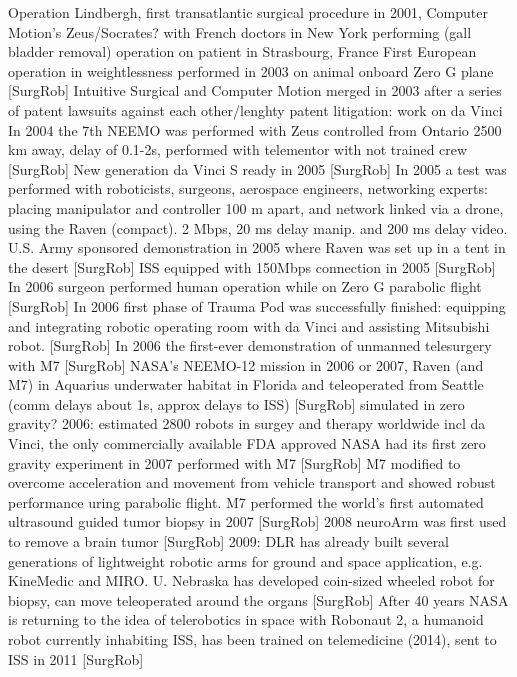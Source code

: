 Operation Lindbergh, first transatlantic surgical procedure in 2001, Computer Motion's Zeus/Socrates? with French doctors in New York performing (gall bladder removal) operation on patient in Strasbourg, France
First European operation in weightlessness performed in 2003 on animal onboard Zero G plane [SurgRob]
Intuitive Surgical and Computer Motion merged in 2003 \citep{bib:telesurg_history} after a series of patent lawsuits against each other/lenghty patent litigation: work on da Vinci
In 2004 the 7th NEEMO was performed with Zeus controlled from Ontario 2500 km away, delay of 0.1-2s, performed with telementor with not trained crew [SurgRob]
New generation da Vinci S ready in 2005 [SurgRob]
In 2005 a test was performed with roboticists, surgeons, aerospace engineers, networking experts: placing manipulator and controller 100 m apart, and network linked via a drone, using the Raven \citep{bib:docatadist} (compact). 2 Mbps, 20 ms delay manip. and 200 ms delay video. U.S. Army sponsored demonstration in 2005 where Raven was set up in a tent in the desert [SurgRob]
ISS equipped with 150Mbps connection in 2005 [SurgRob]
In 2006 surgeon performed human operation while on Zero G parabolic flight [SurgRob] 
In 2006 first phase of Trauma Pod was successfully finished: equipping and integrating robotic operating room  with da Vinci and assisting Mitsubishi robot. [SurgRob]
In 2006 the first-ever demonstration of unmanned telesurgery with M7 [SurgRob]
NASA's NEEMO-12 mission in 2006 or 2007, Raven (and M7) in Aquarius underwater habitat in Florida and teleoperated from Seattle (comm delays about 1s, approx delays to ISS) [SurgRob] simulated in zero gravity?
2006: estimated 2800 robots in surgey and therapy worldwide incl da Vinci, the only commercially available FDA approved
NASA had its first zero gravity experiment in 2007 performed with M7 [SurgRob] M7 modified to overcome acceleration and movement from vehicle transport and showed robust performance uring parabolic flight.
M7 performed the world's first automated ultrasound guided tumor biopsy in 2007 [SurgRob]
2008 neuroArm was first used to remove a brain tumor [SurgRob]
2009: DLR has already built several generations of lightweight robotic arms for ground and space application, e.g. KineMedic and MIRO. U. Nebraska has developed coin-sized wheeled robot for biopsy, can move teleoperated around the organs [SurgRob]
After 40 years NASA is returning to the idea of telerobotics in space with Robonaut 2, a humanoid robot currently inhabiting ISS, has been trained on telemedicine (2014), sent to ISS in 2011 [SurgRob]


